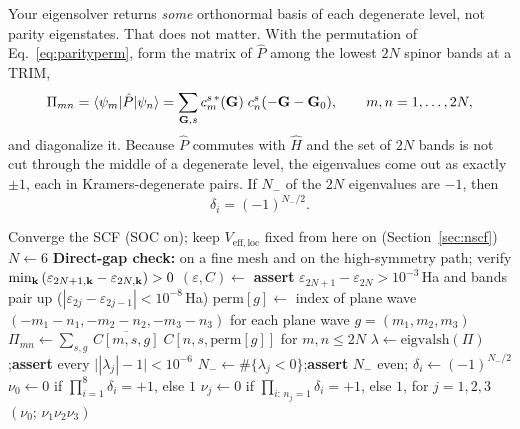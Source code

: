 Your eigensolver returns \emph{some} orthonormal basis of each degenerate
level, not parity eigenstates. That does not matter. With the permutation
of Eq.~\eqref{eq:parityperm}, form the matrix of $\hat P$ among the lowest
$2N$ spinor bands at a TRIM,
\begin{equation}
\Pi_{mn} = \braket{\psi_m|\hat P|\psi_n}
= \sum_{\mathbf{G}, s} c^{s\,*}_m(\mathbf{G})\; c^{s}_n(-\mathbf{G}-\mathbf{G}_0),
\qquad m,n = 1,\dots,2N,
\end{equation}
and diagonalize it. Because $\hat P$ commutes with $\hat H$ and the set of
$2N$ bands is not cut through the middle of a degenerate level, the
eigenvalues come out as exactly $\pm1$, each in Kramers-degenerate
pairs. If $N_-$ of the $2N$ eigenvalues are $-1$, then
\begin{equation}
\delta_i = (-1)^{N_-/2}.
\label{eq:deltafromcount}
\end{equation}

\begin{algorithm}[H]
\caption{$\mathbb{Z}_2$ invariant of gold from parities}
\label{alg:z2}
\begin{algorithmic}[1]
\State Converge the SCF (SOC on); keep $V_{\mathrm{eff,loc}}$ fixed from
here on (Section~\ref{sec:nscf})
\State $N \gets 6$ 
\State \textbf{Direct-gap check:}  on a fine mesh and on
the high-symmetry path; verify
$\min_{\mathbf{k}}\,(\varepsilon_{2N+1,\mathbf{k}} - \varepsilon_{2N,\mathbf{k}}) > 0$
\State $(\varepsilon, C) \gets$ 
\State \textbf{assert} $\varepsilon_{2N+1} - \varepsilon_{2N} > 10^{-3}$\,Ha
and bands pair up ($|\varepsilon_{2j} - \varepsilon_{2j-1}| < 10^{-8}$\,Ha)
\State $\mathrm{perm}[g] \gets$ index of plane wave
$(-m_1{-}n_1, -m_2{-}n_2, -m_3{-}n_3)$ for each plane wave $g = (m_1,m_2,m_3)$
\State $\Pi_{mn} \gets \sum_{s,g}\, \overline{C[m,s,g]}\; C[n,s,\mathrm{perm}[g]]$
for $m,n \le 2N$
\State $\lambda \gets \mathrm{eigvalsh}(\Pi)$;\quad \textbf{assert} every
$\big||\lambda_j| - 1\big| < 10^{-6}$
\State $N_- \gets \#\{\lambda_j < 0\}$;\quad \textbf{assert} $N_-$ even;\quad
$\delta_i \gets (-1)^{N_-/2}$
\EndFor
\State $\nu_0 \gets 0$ if $\prod_{i=1}^{8}\delta_i = +1$, else $1$
\State $\nu_j \gets 0$ if $\prod_{i:\,n_j = 1}\delta_i = +1$, else $1$,
for $j = 1,2,3$ \Comment{weak indices: four TRIM each}
\State \Return $(\nu_0;\,\nu_1\nu_2\nu_3)$
\end{algorithmic}
\end{algorithm}

